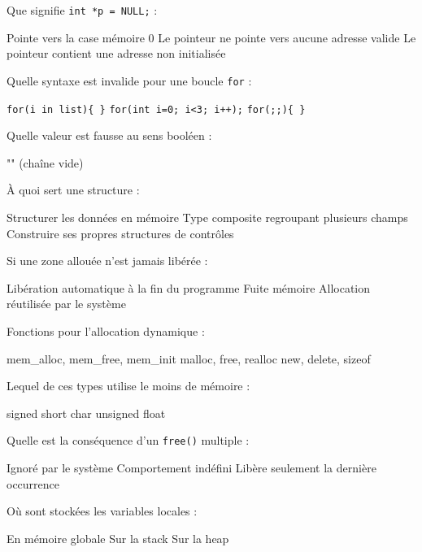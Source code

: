 \documentclass[12pt]{exam}
\begin{document}
\begin{questions}
\question Que signifie \texttt{int *p = NULL;} :
\begin{checkboxes}
 \choice Pointe vers la case mémoire 0
 \CorrectChoice Le pointeur ne pointe vers aucune adresse valide
 \choice Le pointeur contient une adresse non initialisée
\end{checkboxes}

\pagebreak{}
\question Quelle syntaxe est invalide pour une boucle \texttt{for} :
\begin{checkboxes}
 \CorrectChoice \texttt{for(i in list)\{ \}}
 \choice \texttt{for(int i=0; i<3; i++);}
 \choice \texttt{for(;;)\{ \}}
\end{checkboxes}

\question Quelle valeur est fausse au sens booléen :
\begin{checkboxes}
 \choice "" (chaîne vide)
\end{checkboxes}

\question À quoi sert une structure :
\begin{checkboxes}
 \CorrectChoice Structurer les données en mémoire
 \CorrectChoice Type composite regroupant plusieurs champs
 \choice Construire ses propres structures de contrôles
\end{checkboxes}

\question Si une zone allouée n’est jamais libérée :
\begin{checkboxes}
 \choice Libération automatique à la fin du programme
 \CorrectChoice Fuite mémoire
 \choice Allocation réutilisée par le système
\end{checkboxes}

\question Fonctions pour l’allocation dynamique :
\begin{checkboxes}
 \choice mem\_alloc, mem\_free, mem\_init
 \CorrectChoice malloc, free, realloc
 \choice new, delete, sizeof
\end{checkboxes}

\question Lequel de ces types utilise le moins de mémoire :
\begin{checkboxes}
 \choice signed short
 \CorrectChoice char
 \choice unsigned float
\end{checkboxes}

\question Quelle est la conséquence d’un \texttt{free()} multiple :
\begin{checkboxes}
 \choice Ignoré par le système
 \CorrectChoice Comportement indéfini
 \choice Libère seulement la dernière occurrence
\end{checkboxes}

\question Où sont stockées les variables locales :
\begin{checkboxes}
 \choice En mémoire globale
 \CorrectChoice Sur la stack
 \choice Sur la heap
\end{checkboxes}

\end{questions}
\end{document}
